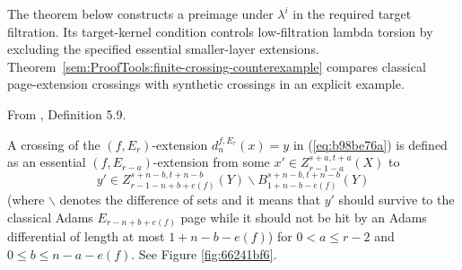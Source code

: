 The theorem below constructs a preimage under $\lambda^i$ in the required
target filtration. Its target-kernel condition controls low-filtration
lambda torsion by excluding the specified essential smaller-layer extensions.
Theorem~\ref{sem:ProofTools:finite-crossing-counterexample} compares
classical page-extension crossings with synthetic crossings in an explicit example.


\begin{definition}
\label{paper:5.9}
From \cite{LWX126}, Definition 5.9.\par

\label{def:41d51149}
    A crossing of the $(f,E_r)$-extension $d_{n}^{f,E_r}(x)=y$ in (\ref{eq:b98be76a}) is defined as an essential $(f, E_{r-a})$-extension from some $x'\in Z_{r-1-a}^{s+a,t+a}(X)$ to
    $$y'\in Z_{r-1-n+b+e(f)}^{s+n-b,t+n-b}(Y)\backslash B_{1+n-b-e(f)}^{s+n-b,t+n-b}(Y)$$
    (where $\backslash$ denotes the difference of sets and it means that $y'$ should survive to the classical Adams $E_{r-n+b+e(f)}$ page while it should not be hit by an Adams differential of length at most $1+n-b-e(f)$) for $0<a \le r-2$ and $0\le b\le n-a-e(f)$. See Figure \ref{fig:66241bf6}.



\end{definition}


